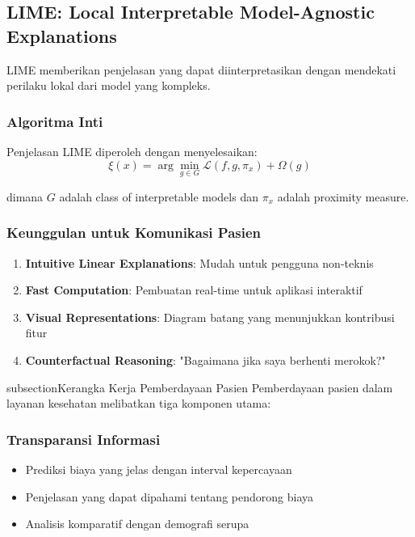 \subsection{LIME: Local Interpretable Model-Agnostic Explanations}
LIME memberikan penjelasan yang dapat diinterpretasikan dengan mendekati perilaku lokal dari model yang kompleks.

\subsubsection{Algoritma Inti}
Penjelasan LIME diperoleh dengan menyelesaikan:
\begin{equation}
\xi(x) = \arg\min_{g \in G} \mathcal{L}(f, g, \pi_x) + \Omega(g)
\end{equation}

dimana $G$ adalah class of interpretable models dan $\pi_x$ adalah proximity measure.

\subsubsection{Keunggulan untuk Komunikasi Pasien}
\begin{enumerate}
    \item \textbf{Intuitive Linear Explanations}: Mudah untuk pengguna non-teknis
    \item \textbf{Fast Computation}: Pembuatan real-time untuk aplikasi interaktif
    \item \textbf{Visual Representations}: Diagram batang yang menunjukkan kontribusi fitur
    \item \textbf{Counterfactual Reasoning}: "Bagaimana jika saya berhenti merokok?"
\end{enumerate}

subsection{Kerangka Kerja Pemberdayaan Pasien}
Pemberdayaan pasien dalam layanan kesehatan melibatkan tiga komponen utama:

\subsubsection{Transparansi Informasi}
\begin{itemize}
    \item Prediksi biaya yang jelas dengan interval kepercayaan
    \item Penjelasan yang dapat dipahami tentang pendorong biaya
    \item Analisis komparatif dengan demografi serupa
\end{itemize}

